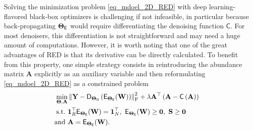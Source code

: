 \documentclass[journal,a4paper]{IEEEtran}
\newcommand{\bTheta}{\boldsymbol{\Theta}}
\newcommand{\MATabund}{\mathbf{A}}
\newcommand{\MATend}{\mathbf{S}}
\begin{document}
Solving the minimization problem \eqref{eq_mdoel_2D_RED} with deep learning-flavored black-box optimizers is challenging if not infeasible, in particular because back-propagating $\bTheta_{\sf E}$ would require differentiating the denoising function $\mathsf{C}$. For most denoisers, this differentiation is not straightforward and may need a huge amount of computations. However, it is worth noting that one of the great advantages of RED is that its  derivative can be directly calculated. To benefit from this property, one simple strategy consists in reintroducing the abundance matrix $\MATabund$ explicitly as an auxiliary variable and then reformulating \eqref{eq_mdoel_2D_RED} as a constrained problem
\begin{equation}
\begin{aligned}\label{eq_mdoel_2D_RED_2}
  \min_{\bTheta, \MATabund}
  &\left\|\mathbf{Y}-\mathsf{D}_{\bTheta_{\sf D}}\left(
  \mathsf{E}_{\bTheta_{\sf E}}(\mathbf{W})\right)\right\|_{\text{F}}^2+\lambda{\MATabund}^\top\left(\MATabund-\mathsf{C}\left(\MATabund\right)\right)\\
    \text{s.t.}\  &\boldsymbol{1}^{\top}_{R}\mathsf{E}_{\bTheta_{\sf E}}(\mathbf{W})=\boldsymbol{1}_{N}^{\top},~\mathsf{E}_{\bTheta_{\sf E}}(\mathbf{W})\geq \boldsymbol{0},~\MATend \geq \boldsymbol{0}\\
    \text{and}\  & \MATabund =\mathsf{E}_{\bTheta_{\sf E}}(\mathbf{W}). 
\end{aligned}
\end{equation}
\end{document}

